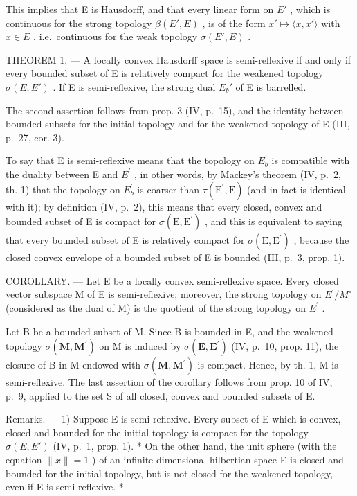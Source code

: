 This implies that E is Hausdorff, and that every linear form on \(E'\) , which is continuous for the strong topology \(\beta(E', E)\) , is of the form \(x' \mapsto \langle x, x' \rangle\) with \(x \in E\) , i.e.~continuous for the weak topology \(\sigma(E', E)\) .

THEOREM 1. --- A locally convex Hausdorff space is semi-reflexive if and only if every bounded subset of E is relatively compact for the weakened topology \(\sigma(E, E')\) . If E is semi-reflexive, the strong dual \(E_b'\) of E is barrelled.

The second assertion follows from prop. 3 (IV, p.~15), and the identity between bounded subsets for the initial topology and for the weakened topology of E (III, p.~27, cor. 3).

To say that E is semi-reflexive means that the topology on \(E_{b}^{\prime}\) is compatible with the duality between E and \(E^{\prime}\) , in other words, by Mackey's theorem (IV, p.~2, th. 1) that the topology on \(E_{b}^{\prime}\) is coarser than \(\tau(\mathrm{E}^{\prime}, \mathrm{E})\) (and in fact is identical with it); by definition (IV, p.~2), this means that every closed, convex and bounded subset of E is compact for \(\sigma(\mathrm{E}, \mathrm{E}^{\prime})\) , and this is equivalent to saying that every bounded subset of E is relatively compact for \(\sigma(\mathrm{E},\mathrm{E}^{\prime})\) , because the closed convex envelope of a bounded subset of E is bounded (III, p.~3, prop. 1).

COROLLARY. --- Let E be a locally convex semi-reflexive space. Every closed vector subspace M of E is semi-reflexive; moreover, the strong topology on \(E^{\prime}/M^{\circ}\) (considered as the dual of M) is the quotient of the strong topology on \(E^{\prime}\) .

Let B be a bounded subset of M. Since B is bounded in E, and the weakened topology \(\sigma(\mathbf{M},\mathbf{M}^{\prime})\) on M is induced by \(\sigma(\mathbf{E},\mathbf{E}^{\prime})\) (IV, p.~10, prop. 11), the closure of B in M endowed with \(\sigma(\mathbf{M},\mathbf{M}^{\prime})\) is compact. Hence, by th. 1, M is semi-reflexive. The last assertion of the corollary follows from prop. 10 of IV, p.~9, applied to the set S of all closed, convex and bounded subsets of E.

Remarks. --- 1) Suppose E is semi-reflexive. Every subset of E which is convex, closed and bounded for the initial topology is compact for the topology \(\sigma(E, E')\) (IV, p.~1, prop. 1). * On the other hand, the unit sphere (with the equation \(\|x\|=1\) ) of an infinite dimensional hilbertian space E is closed and bounded for the initial topology, but is not closed for the weakened topology, even if E is semi-reflexive. *

